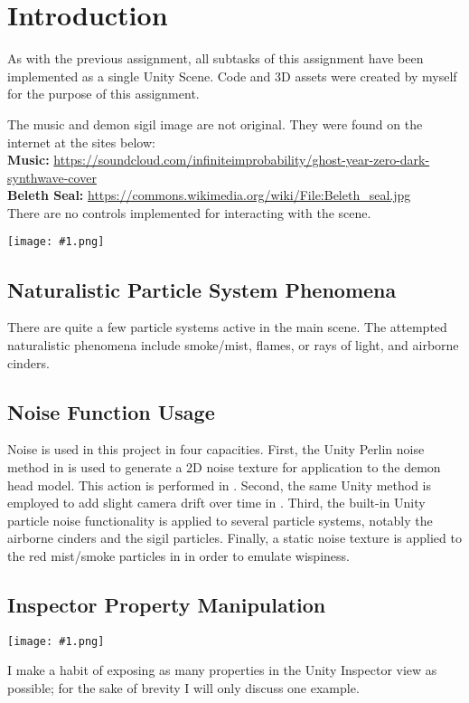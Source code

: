 \documentclass[12pt]{article}
\newcommand{\putpicture}[1]{\begin{center}\texttt{[image: \#1.png]}\end{center}}
\begin{document}
\maketitle

\section*{Introduction}
As with the previous assignment, all subtasks of this assignment have been implemented as a single Unity Scene. Code and 3D assets were created by myself for the purpose of this assignment.

The music and demon sigil image are not original. They were found on the internet at the sites below: \\[1em]
\noindent \textbf{Music:} \url{https://soundcloud.com/infiniteimprobability/ghost-year-zero-dark-synthwave-cover} \\
\noindent \textbf{Beleth Seal:} \url{https://commons.wikimedia.org/wiki/File:Beleth_seal.jpg} \\[1em]

There are no controls implemented for interacting with the scene.

\putpicture{part1a}
\subsection*{Naturalistic Particle System Phenomena}
There are quite a few particle systems active in the main scene. The attempted naturalistic phenomena include smoke/mist, flames, or rays of light, and airborne cinders.

\subsection*{Noise Function Usage}
Noise is used in this project in four capacities. First, the Unity Perlin noise method in  is used to generate a 2D noise texture for application to the demon head model. This action is performed in . Second, the same Unity method is employed to add slight camera drift over time in . Third, the built-in Unity particle noise functionality is applied to several particle systems, notably the airborne cinders and the sigil particles. Finally, a static noise texture is applied to the  red mist/smoke particles in  in order to emulate wispiness.

\subsection*{Inspector Property Manipulation}
\putpicture{part1b}
I make a habit of exposing as many properties in the Unity Inspector view as possible; for the sake of brevity I will only discuss one example.
\end{document}
